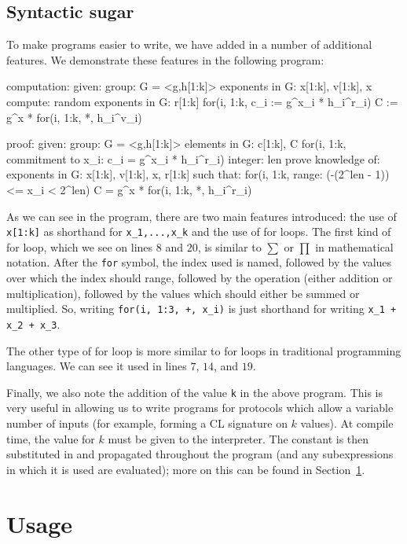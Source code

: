 \documentclass[letterpaper,11pt]{article}
\begin{document}
\subsection{Syntactic sugar}

To make programs easier to write, we have added in a number of additional 
features.  We demonstrate these features in the following program:

\begin{ZKPVerbatim}
computation:
	given:
		group: G = <g,h[1:k]>
		exponents in G: x[1:k], v[1:k], x
	compute:
		random exponents in G: r[1:k]
		for(i, 1:k, c_i := g^x_i * h_i^r_i)
		C := g^x * for(i, 1:k, *, h_i^v_i)

proof:
	given:
		group: G = <g,h[1:k]>
		elements in G: c[1:k], C
			for(i, 1:k, commitment to x_i: c_i = g^x_i * h_i^r_i)
		integer: len
	prove knowledge of:
		exponents in G: x[1:k], v[1:k], x, r[1:k]
	such that:
		for(i, 1:k, range: (-(2^len - 1)) <= x_i < 2^len)
		C = g^x * for(i, 1:k, *, h_i^r_i)
\end{ZKPVerbatim}

As we can see in the program, there are two main features introduced: the use
of \verb#x[1:k]# as shorthand for \verb#x_1,...,x_k# and the use of for loops.
The first kind of for loop, which we see on lines $8$ and $20$, is similar to
$\sum$ or $\prod$ in mathematical notation.  After the \verb#for# symbol, the 
index used is named, followed by the values over which the index should range, 
followed by the operation (either addition or multiplication), followed by the
values which should either be summed or multiplied.  So, writing 
\verb#for(i, 1:3, +, x_i)# is just shorthand for writing 
\verb#x_1 + x_2 + x_3#.  

The other type of for loop is more similar to for loops in traditional
programming languages.  We can see it used in lines $7$, $14$, and $19$.

Finally, we also note the addition of the value \verb#k# in the above program.
This is very useful in allowing us to write programs for protocols which allow
a variable number of inputs (for example, forming a CL signature on $k$
values).  At compile time, the value for $k$ must be given to the interpreter.
The constant is then substituted in and propagated throughout the program (and
any subexpressions in which it is used are evaluated); more on this can be
found in Section~\ref{sec:usage}.

\section{Usage}\label{sec:usage}
\end{document}
